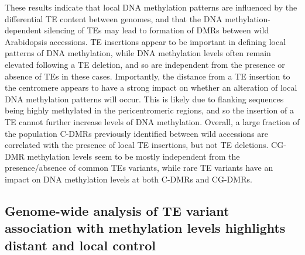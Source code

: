 \documentclass[12pt]{article}
\begin{document}
These results indicate that local DNA methylation patterns are
influenced by the differential TE content between genomes, and that the
DNA methylation-dependent silencing of TEs may lead to formation of DMRs
between wild Arabidopsis accessions. TE insertions appear to be
important in defining local patterns of DNA methylation, while DNA
methylation levels often remain elevated following a TE deletion, and so
are independent from the presence or absence of TEs in these cases.
Importantly, the distance from a TE insertion to the centromere appears
to have a strong impact on whether an alteration of local DNA
methylation patterns will occur. This is likely due to flanking
sequences being highly methylated in the pericentromeric regions, and so
the insertion of a TE cannot further increase levels of DNA methylation.
Overall, a large fraction of the population C-DMRs previously identified
between wild accessions are correlated with the presence of local TE
insertions, but not TE deletions. CG-DMR methylation levels seem to be
mostly independent from the presence/absence of common TEs variants,
while rare TE variants have an impact on DNA methylation levels at both
C-DMRs and CG-DMRs.

\subsection{Genome-wide analysis of TE variant association with methylation
levels highlights distant and local control}
\end{document}
